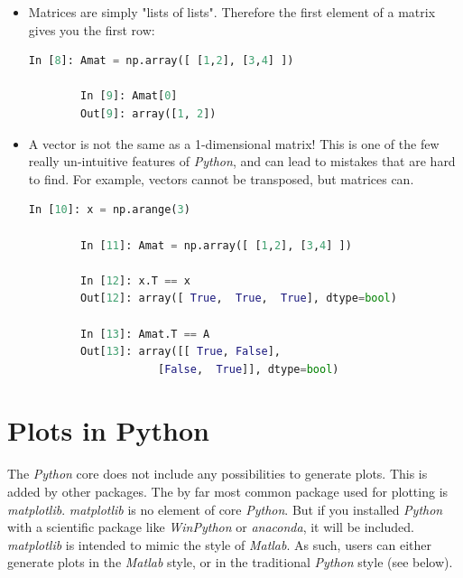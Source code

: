 \begin{itemize}
  \item Matrices are simply "lists of lists". Therefore the first element of a matrix gives you the first row:
    \begin{lstlisting}[language=Python]
        In [8]: Amat = np.array([ [1,2], [3,4] ])

        In [9]: Amat[0]
        Out[9]: array([1, 2])
    \end{lstlisting}
  \item A vector is not the same as a 1-dimensional matrix! This is one of the few really un-intuitive features of \emph{Python}, and can lead to mistakes that are hard to find. For example, vectors cannot be transposed, but matrices can.
      \begin{lstlisting}[language=Python]
        In [10]: x = np.arange(3)

        In [11]: Amat = np.array([ [1,2], [3,4] ])

        In [12]: x.T == x
        Out[12]: array([ True,  True,  True], dtype=bool)

        In [13]: Amat.T == A
        Out[13]: array([[ True, False],
                    [False,  True]], dtype=bool)
    \end{lstlisting}
\end{itemize}

\section{Plots in Python}

The \emph{Python} core does not include any possibilities to generate plots. This is added by other packages. The by far most common package used for plotting is \emph{\gls{matplotlib}}. \emph{matplotlib} is no element of core \emph{Python}. But if you installed \emph{Python} with a scientific package like \emph{WinPython} or \emph{anaconda}, it will be included. \emph{matplotlib} is intended to mimic the style of \emph{Matlab}. As such, users can either generate plots in the \emph{Matlab} style, or in the traditional \emph{Python} style (see below).

